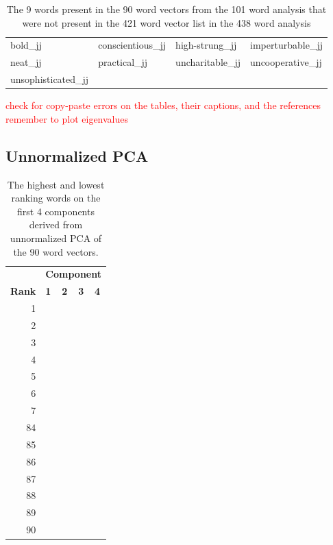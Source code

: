 \documentclass[10pt,letterpaper]{book}
\newcommand{\todo}[1]{\textcolor{red}{#1}}
\begin{document}
\begin{table}[!htbp]
    \begin{tabular}{| llll | }
        \hline
        bold\_jj & conscientious\_jj & high-strung\_jj & imperturbable\_jj \\
        neat\_jj & practical\_jj & uncharitable\_jj & uncooperative\_jj \\
        unsophisticated\_jj & & &\\
        \hline
    \end{tabular}
    \caption{The 9 words present in the 90 word vectors from the 101 word 
    analysis that were not present in the 421 word vector list in the 438 
    word analysis}
    \label{tab:additionalwordsincombined}
\end{table}


\todo{check for copy-paste errors on the tables, their captions, and the references}
\todo{remember to plot eigenvalues}

\subsection{Unnormalized PCA}

\begin{table}[!htbp]
    \begin{tabular}{| rllll | }
        \hline
         & \multicolumn{4}{c|}{\textbf{Component}} \\
        \textbf{Rank} & \textbf{1} & \textbf{2} & \textbf{3} & \textbf{4} \\
        \hline
        1 &  &  &  &  \\
        2 &  &  &  &  \\
        3 &  &  &  &  \\
        4 &  &  &  &  \\
        5 &  &  &  &  \\
        6 &  &  &  &  \\
        7 &  &  &  &  \\
        \hline
        84 &  &  &  &  \\
        85 &  &  &  &  \\
        86 &  &  &  &  \\
        87 &  &  &  &  \\
        88 &  &  &  &  \\
        89 &  &  &  &  \\
        90 &  &  &  &  \\
        \hline
    \end{tabular}
    \caption{The highest and lowest ranking words on the first 4 components 
    derived from unnormalized PCA of the 90 word vectors.}
    \label{tab:438and101wordsRankingsUnnormalizedPCA}
\end{table}
\end{document}
